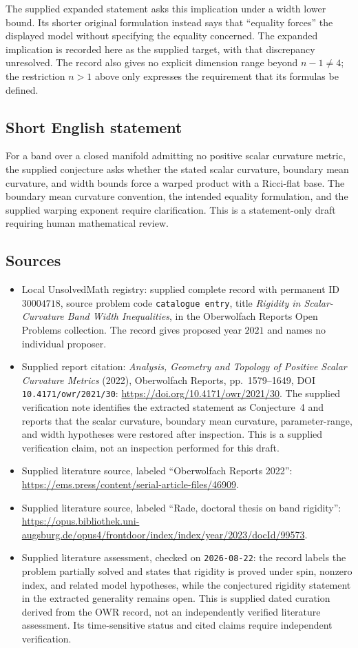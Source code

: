 \documentclass[11pt]{article}
\begin{document}
The supplied expanded statement asks this implication under a width lower bound. Its shorter original formulation instead says that ``equality forces'' the displayed model without specifying the equality concerned. The expanded implication is recorded here as the supplied target, with that discrepancy unresolved. The record also gives no explicit dimension range beyond \(n-1\ne4\); the restriction \(n>1\) above only expresses the requirement that its formulas be defined.
\subsection{Short English statement}
For a band over a closed manifold admitting no positive scalar curvature metric, the supplied conjecture asks whether the stated scalar curvature, boundary mean curvature, and width bounds force a warped product with a Ricci-flat base. The boundary mean curvature convention, the intended equality formulation, and the supplied warping exponent require clarification. This is a statement-only draft requiring human mathematical review.
\subsection{Sources}
\begin{itemize}
\item Local UnsolvedMath registry: supplied complete record with permanent ID \(30004718\), source problem code \texttt{catalogue entry}, title \emph{Rigidity in Scalar-Curvature Band Width Inequalities}, in the Oberwolfach Reports Open Problems collection. The record gives proposed year \(2021\) and names no individual proposer.
\item Supplied report citation: \emph{Analysis, Geometry and Topology of Positive Scalar Curvature Metrics} (2022), Oberwolfach Reports, pp.~1579--1649, DOI \texttt{10.4171/owr/2021/30}: \url{https://doi.org/10.4171/owr/2021/30}. The supplied verification note identifies the extracted statement as Conjecture~4 and reports that the scalar curvature, boundary mean curvature, parameter-range, and width hypotheses were restored after inspection. This is a supplied verification claim, not an inspection performed for this draft.
\item Supplied literature source, labeled ``Oberwolfach Reports 2022'': \url{https://ems.press/content/serial-article-files/46909}.
\item Supplied literature source, labeled ``Rade, doctoral thesis on band rigidity'': \url{https://opus.bibliothek.uni-augsburg.de/opus4/frontdoor/index/index/year/2023/docId/99573}.
\item Supplied literature assessment, checked on \texttt{2026-08-22}: the record labels the problem partially solved and states that rigidity is proved under spin, nonzero index, and related model hypotheses, while the conjectured rigidity statement in the extracted generality remains open. This is supplied dated curation derived from the OWR record, not an independently verified literature assessment. Its time-sensitive status and cited claims require independent verification.
\end{itemize}
\end{document}
